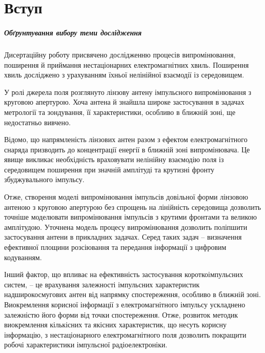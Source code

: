 \chapter*{Вступ}

\paragraph{Обґрунтування вибору теми дослідження}

Дисертаційну роботу присвячено дослідженню процесів випромінювання, поширення 
й приймання нестаціонарних електромагнітних хвиль. Поширення хвиль досліджено 
з урахуванням їхньої нелінійної взаємодії із середовищем. 

У ролі джерела поля розглянуто лінзову антену імпульсного випромінювання 
з круговою апертурою. Хоча антена й знайшла широке застосування в задачах 
метрології та зондування, її характеристики, особливо в ближній зоні, 
ще недостатньо вивчено.

Відомо, що напрямленість лінзових антен разом з ефектом електромагнітного 
снаряда призводить до концентрації енергії в ближній зоні випромінювача. Це 
явище викликає необхідність враховувати нелінійну взаємодію поля із середовищем 
поширення при значній амплітуді та крутизні фронту збуджувального імпульсу.

Отже, створення моделі випромінювання імпульсів довільної 
форми лінзовою антеною з круговою апертурою без спрощень на лінійність 
середовища дозволить точніше моделювати випромінювання імпульсів з 
крутими фронтами та великою амплітудою. Уточнена модель процесу 
випромінювання дозволить поліпшити застосування антени в прикладних 
задачах. Серед таких задач -- визначення ефективної площини 
розсіювання та передання інформації з цифровим кодуванням.

Інший фактор, що впливає на ефективність застосування короткоімпульсних
систем, -- це врахування залежності імпульсних характеристик 
надширокосмугових антен від напрямку спостереження, особливо в ближній зоні. 
Виокремлення корисної інформації з електромагнітного імпульсу ускладнено 
залежністю його форми від точки спостереження. Отже, 
розвиток методик виокремлення кількісних та якісних характеристик, що несуть 
корисну інформацію, з нестаціонарного електромагнітного поля дозволить 
покращити робочі характеристики імпульсної радіоелектроніки.

